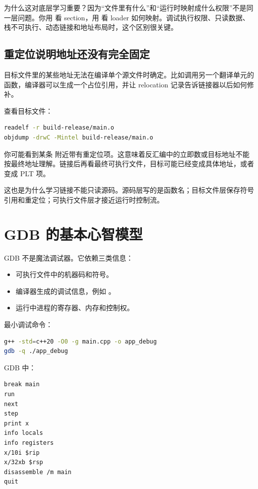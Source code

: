 为什么这对底层学习重要？因为“文件里有什么”和“运行时映射成什么权限”不是同一层问题。你用  看 section，用  看 loader 如何映射。调试执行权限、只读数据、栈不可执行、动态链接和地址布局时，这个区别很关键。

\subsection{重定位说明地址还没有完全固定}

目标文件里的某些地址无法在编译单个源文件时确定。比如调用另一个翻译单元的函数，编译器可以生成一个占位引用，并让 relocation 记录告诉链接器以后如何修补。

查看目标文件：

\begin{lstlisting}[language=bash]
readelf -r build-release/main.o
objdump -drwC -Mintel build-release/main.o
\end{lstlisting}

你可能看到某条  附近带有重定位项。这意味着反汇编中的立即数或目标地址不能按最终地址理解。链接后再看最终可执行文件，目标可能已经变成具体地址，或者变成 PLT 项。

这也是为什么学习链接不能只读源码。源码层写的是函数名；目标文件层保存符号引用和重定位；可执行文件层才接近运行时控制流。

\section{GDB 的基本心智模型}

GDB 不是魔法调试器。它依赖三类信息：

\begin{itemize}
  \item 可执行文件中的机器码和符号。
  \item 编译器生成的调试信息，例如 。
  \item 运行中进程的寄存器、内存和控制权。
\end{itemize}

最小调试命令：

\begin{lstlisting}[language=bash]
g++ -std=c++20 -O0 -g main.cpp -o app_debug
gdb -q ./app_debug
\end{lstlisting}

GDB 中：

\begin{lstlisting}
break main
run
next
step
print x
info locals
info registers
x/10i $rip
x/32xb $rsp
disassemble /m main
quit
\end{lstlisting}

